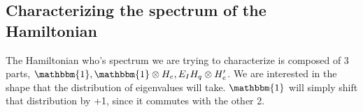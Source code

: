 \documentclass{article}
\begin{document}
\begin{comment}
    

Then,
\begin{equation}
    H|\psi(0)\rangle=|q_1\rangle(\frac{2+q_1}{\sqrt{w}})\sum_jc_j|e_j\rangle+|q_2\rangle(\frac{2+q_2}{\sqrt{1-w}})\sum_jc_j'|e_j\rangle
\end{equation}
or more generally,
\begin{equation}
    |\psi(t)\rangle=|q_1\rangle(\frac{2+q_1}{\sqrt{w}})\sum_jc_j|e_j\rangle+|q_2\rangle(\frac{2+q_2}{\sqrt{1-w}})\sum_jc_j'|e_j\rangle
\end{equation}

which is no longer separable, and by its factorizability by $|q_1\rangle$ and $|q_2\rangle$, we understand that for all $t$,
\begin{equation}
    |\psi(t)\rangle=\frac{1}{\sqrt{N}}(s_1|q_1\rangle|E_1(t)\rangle+s_2|q_2\rangle|E_2(t)\rangle)
\end{equation}
This means that the Schmidt decomposition of our system+env always has 2 nonzeros schmidt weights at most. But this decomposition (ie in terms of 2 states $|q_i\rangle |E_j\rangle$) is not immediately the 2 schmidt states. Indeed, Schmidt 1 starts up as $|\psi\rangle$ and evolves to something with most of its weight in a factor in from of $|q_1\rangle|E_1\rangle$. But of note, our pure state starts with nonzero value in 200+200 total eigenstates, the Schmidt states share theses with each other, 200 each. (Need to do a part where we look closer at evolution, see black board image.)

Note, $|E_i\rangle=\sum_jc_{ji}(t)|e_j\rangle$.
\end{comment}

\begin{comment}
Note that the weight in from of both states are equal if,
    \begin{equation}
        q_1=2(\frac{\sqrt{w}}{\sqrt{1-w}}-1)+q_2\frac{\sqrt{w}}{\sqrt{1-w}}
    \end{equation}
\end{comment}

\subsection{Characterizing the spectrum of the Hamiltonian}
The Hamiltonian who's spectrum we are trying to characterize is composed of 3 parts, $\mathbbm{1}, \mathbbm{1}\otimes H_e,E_IH_q\otimes H_e'$. We are interested in the shape that the distribution of eigenvalues will take. $\mathbbm{1}$ will simply shift that distribution by +1, since it commutes with the other 2. \\
\end{document}
